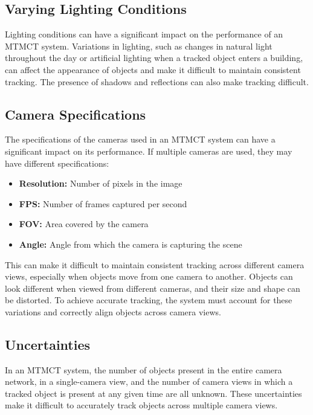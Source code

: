 \subsection{Varying Lighting Conditions}\label{subsec:varying_lighting_conditions}
Lighting conditions can have a significant impact on the performance of an MTMCT system. Variations in lighting, such as changes in natural light throughout the day or artificial lighting when a tracked object enters a building, can affect the appearance of objects and make it difficult to maintain consistent tracking. The presence of shadows and reflections can also make tracking difficult.

\subsection{Camera Specifications}\label{subsec:camera_specification}
The specifications of the cameras used in an MTMCT system can have a significant impact on its performance. If multiple cameras are used, they may have different specifications:

\begin{itemize}
    \item \textbf{Resolution:} Number of pixels in the image
    \item \textbf{FPS:} Number of frames captured per second
    \item \textbf{FOV:} Area covered by the camera
    \item \textbf{Angle:} Angle from which the camera is capturing the scene
\end{itemize}

This can make it difficult to maintain consistent tracking across different camera views, especially when objects move from one camera to another. Objects can look different when viewed from different cameras, and their size and shape can be distorted. To achieve accurate tracking, the system must account for these variations and correctly align objects across camera views.

\subsection{Uncertainties}\label{subsec:uncertainties}
In an MTMCT system, the number of objects present in the entire camera network, in a single-camera view, and the number of camera views in which a tracked object is present at any given time are all unknown. These uncertainties make it difficult to accurately track objects across multiple camera views.

